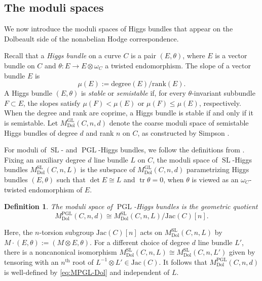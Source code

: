 \documentclass[11pt,reqno]{amsart}
\theoremstyle{plain} %
\newtheorem{definition}[theorem]{Definition}
\theoremstyle{definition}
\DeclareMathOperator{\GL}{GL}
\DeclareMathOperator{\SL}{SL}
\DeclareMathOperator{\PGL}{PGL}
\DeclareMathOperator{\Tr}{tr}
\newcommand{\Dol}{\mathrm{Dol}}
\newcommand{\Jac}{\mathrm{Jac}}
\begin{document}
\subsection{The  moduli spaces}\label{subsec: relative dolbeault}
We now introduce the moduli spaces of Higgs bundles that appear on the Dolbeault side of the nonabelian Hodge correspondence. %

Recall that a \textit{Higgs bundle} on a curve $C$ is a pair $(E, \theta)$, where $E$ is a vector bundle on $C$ and $\theta\colon E \to E \otimes \omega_C$ a twisted endomorphism. The slope of a vector bundle $E$ is 
\[
\mu(E) := \mathrm{degree} (E) / \mathrm{rank} (E).
\]
A Higgs bundle $(E, \theta)$ is \emph{stable} or  \emph{semistable} if, for every $\theta$-invariant subbundle $F \subset E$, the slopes satisfy $\mu(F) < \mu(E)$ or $\mu(F) \leq \mu(E)$, respectively. When the degree and rank are coprime, a Higgs bundle is stable if and only if it is semistable.   Let $M^{\GL}_{\Dol}(C,n,d)$ denote the coarse moduli space of semistable Higgs bundles of degree $d$ and rank $n$ on $C$, as constructed by Simpson \cite{Simpson-reps2}.



For moduli of $\SL$- and $\PGL$-Higgs bundles, we follow the definitions from \cite[\S 2]{Hausel-Thaddeus-mirror}. 
Fixing an auxiliary degree $d$ line bundle $L$ on $C$, the moduli space of $\SL$-Higgs bundles $M^{\SL}_{\Dol}(C,n,L)$ is the subspace of $M^{\GL}_{\Dol}(C,n,d)$ parametrizing Higgs bundles $(E, \theta)$ such that $\det E \cong L$ and $\Tr \theta = 0$, when  $\theta$ is viewed as an $\omega_C$-twisted endomorphism of $E$. 

\begin{definition}
The moduli space of $\PGL$-Higgs bundles is the geometric quotient 
\begin{equation} \label{eq:MPGL-Dol}
M^{\PGL}_{\Dol}(C,n,d) 
\cong M^{\SL}_{\Dol}(C,n,L)/\Jac(C)[n].
\end{equation}
\end{definition}

\noindent Here, the $n$-torsion subgroup $\Jac(C)[n]$ acts on $M^{\SL}_{\Dol}(C,n,L)$ by $M \cdot (E, \theta) := (M \otimes E, \theta).$ For a different choice of degree $d$ line bundle $L'$, there is a noncanonical isomorphism $M^{\SL}_{\Dol}(C,n,L) \cong M^{\SL}_{\Dol}(C,n,L')$ given by tensoring with an $n^{\mathrm{th}}$ root of $L^{-1} \otimes L' \in \Jac(C)$. It follows that $M^{\PGL}_{\Dol}(C,n,d)$ is well-defined by \eqref{eq:MPGL-Dol} and independent of $L$.
\end{document}
